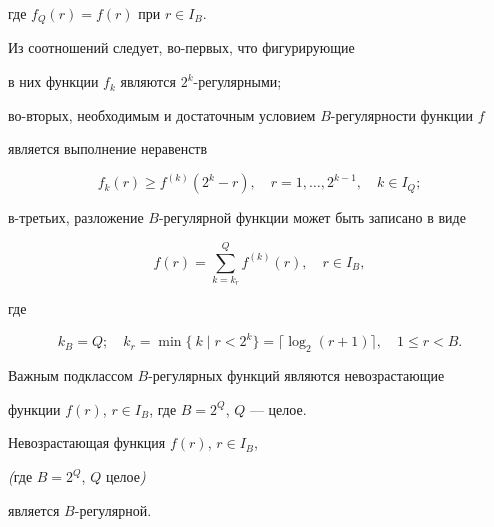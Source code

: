 где $f_{Q}(r)=f(r)$ при $r \in I_{B}$.





Из соотношений  следует, во-первых, что фигурирующие


в них функции $f_{k}$ являются $2^{k}$-регулярными;


во-вторых, необходимым и достаточным условием $B$-регулярности функции $f$


является выполнение неравенств


$$


f_{k}(r) \ge f^{(k)}(2^{k}-r),\quad r=1, \dotsc ,2^{k-1},\quad k \in I_{Q};


$$


в-третьих, разложение $B$-регулярной функции может быть записано в виде


$$


f(r)=\sum _{k=k_{r}}^{Q} f^{(k)}(r),\quad r \in I_{B},


$$


где


$$


k_{B}=Q;\quad


k_{r}=\min \{\ k\mid r<2^{k}\}=\lceil \log_{2}{(r+1)} \rceil,\quad


1 \le r<B.


$$





Важным подклассом $B$-регулярных функций являются невозрастающие


функции $f(r)$, $r \in I_{B}$, где $B=2^{Q}$, $Q$ --- целое.





\begin{lem}


\label {lm1}


Невозрастающая функция $f(r)$, $r \in I_{B}$,


{\em (}где $B=2^{Q}$, $Q$ целое{\em )}


является $B$-регулярной.


\end{lem}





\section{\ }






